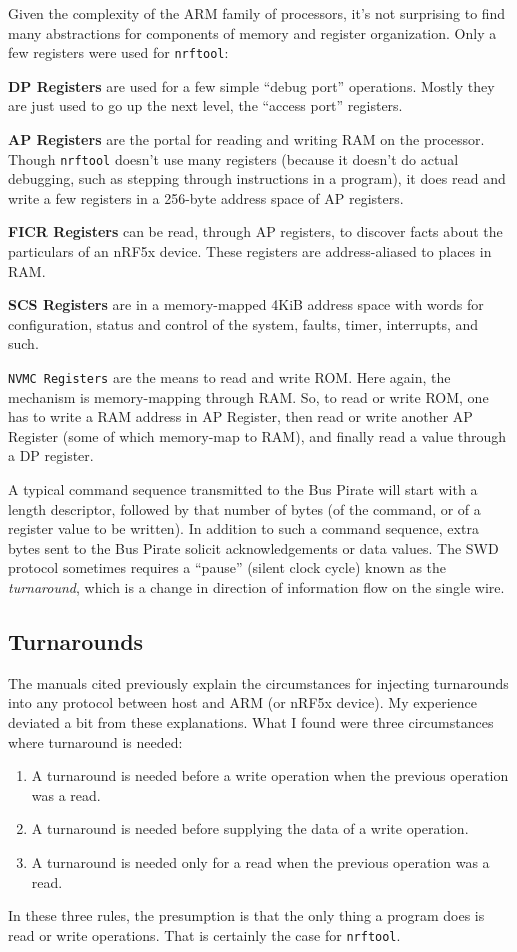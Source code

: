 \documentclass{article}
\begin{document}
Given the complexity of the ARM family of processors, it's not surprising to find many abstractions for
components of memory and register organization. Only a few registers were used for \texttt{nrftool}:
\begin{trivlist}
\item \textbf{DP Registers} are used for a few simple ``debug port'' operations. Mostly they are just
used to go up the next level, the ``access port'' registers.
\item \textbf{AP Registers} are the portal for reading and writing RAM on the processor. Though
\texttt{nrftool} doesn't use many registers (because it doesn't do actual debugging, such as stepping
through instructions in a program), it does read and write a few registers in a 256-byte address
space of AP registers. 
\item \textbf{FICR Registers} can be read, through AP registers, to discover facts about the 
particulars of an nRF5x device. These registers are address-aliased to places in RAM. 
\item \textbf{SCS Registers} are in a memory-mapped 4KiB address space with words for configuration,
status and control of the system, faults, timer, interrupts, and such.
\item \texttt{NVMC Registers} are the means to read and write ROM. Here again, the mechanism is
memory-mapping through RAM. So, to read or write ROM, one has to write a RAM address in AP Register, 
then read or write another AP Register (some of which memory-map to RAM), and finally read a value
through a DP register.
\end{trivlist}
A typical command sequence transmitted to the Bus Pirate will start with a length descriptor, 
followed by that number of bytes (of the command, or of a register value to be written). In 
addition to such a command sequence, extra bytes sent to the Bus Pirate solicit acknowledgements
or data values. The SWD protocol sometimes requires a ``pause'' (silent clock cycle) known as
the \emph{turnaround}, which is a change in direction of information flow on the single wire.

\subsection*{Turnarounds}

The manuals cited previously explain the circumstances for injecting turnarounds into any 
protocol between host and ARM (or nRF5x device). My experience deviated a bit from these 
explanations. What I found were three circumstances where turnaround is needed:
\begin{enumerate}
\item A turnaround is needed before a write operation when the previous operation was a read.
\item A turnaround is needed before supplying the data of a write operation.
\item A turnaround is needed only for a read when the previous operation was a read.
\end{enumerate}
In these three rules, the presumption is that the only thing a program does is read or write operations.
That is certainly the case for \texttt{nrftool}.
\end{document}
